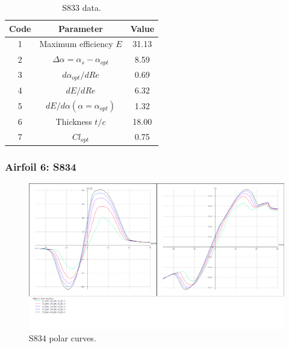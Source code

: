 \documentclass[../TFG_Annex.tex]{subfiles}
\begin{document}
\begin{table}[h!]
	\centering
	\begin{tabular}{c|c|c}
		Code & Parameter                                    & Value  \\ \hline
		1    & Maximum efficiency $E$                      &       31.13           \\
		2    & $\Delta \alpha=\alpha_{s}-\alpha_{opt}$    &           8.59          \\
		3    & ${d\alpha_{opt}}/{dRe}$                     &             0.69     \\
		4    & ${dE}/{dRe}$                                &        6.32           \\
		5    & ${dE}/{d \alpha} (\alpha=\alpha_{opt})$      &           1.32        \\
		6    & Thickness $t/c$                            &              18.00      \\
		7    & $Cl_{opt}$  &   0.75
	\end{tabular}
	\caption{S833 data.}
	\label{tab:Airf5}
\end{table}

\newpage
\subsubsection{Airfoil 6: S834}


\begin{figure}[h!]
	\centering
	\includegraphics[width=1\linewidth]{"../../04-Airfoil selection/Imatges airfoils/6-S834"}
	\caption{S834 polar curves.}
	\label{fig:6-s834}
\end{figure}
\end{document}
